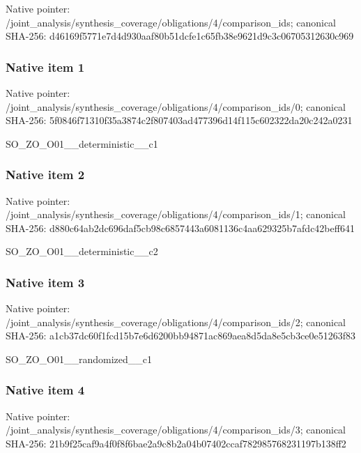 \documentclass[10pt,a4paper]{article}
\begin{document}
Native pointer: /joint\_analysis/synthesi\allowbreak{}s\_coverage/obligations/4\allowbreak{}/comparison\_ids; canonical SHA-256: d46169f5771e7d4d930aaf80\allowbreak{}b51dcfe1c65fb38e9621d9c3\allowbreak{}c06705312630c969



\subsubsection{Native item 1}


Native pointer: /joint\_analysis/synthesi\allowbreak{}s\_coverage/obligations/4\allowbreak{}/comparison\_ids/0; canonical SHA-256: 5f0846f71310f35a3874c2f8\allowbreak{}07403ad477396d14f115c602\allowbreak{}322da20c242a0231


SO\_ZO\_O01\_\_deterministic\_\_c1


\subsubsection{Native item 2}


Native pointer: /joint\_analysis/synthesi\allowbreak{}s\_coverage/obligations/4\allowbreak{}/comparison\_ids/1; canonical SHA-256: d880c64ab2dc696daf5cb98c\allowbreak{}6857443a6081136c4aa62932\allowbreak{}5b7afdc42beff641


SO\_ZO\_O01\_\_deterministic\_\_c2


\subsubsection{Native item 3}


Native pointer: /joint\_analysis/synthesi\allowbreak{}s\_coverage/obligations/4\allowbreak{}/comparison\_ids/2; canonical SHA-256: a1cb37dc60f1fcd15b7e6d62\allowbreak{}00bb94871ac869aea8d5da8e\allowbreak{}5cb3ce0e51263f83


SO\_ZO\_O01\_\_randomized\_\_c1


\subsubsection{Native item 4}


Native pointer: /joint\_analysis/synthesi\allowbreak{}s\_coverage/obligations/4\allowbreak{}/comparison\_ids/3; canonical SHA-256: 21b9f25caf9a4f0f8f6bae2a\allowbreak{}9c8b2a04b07402ccaf782985\allowbreak{}768231197b138ff2
\end{document}
